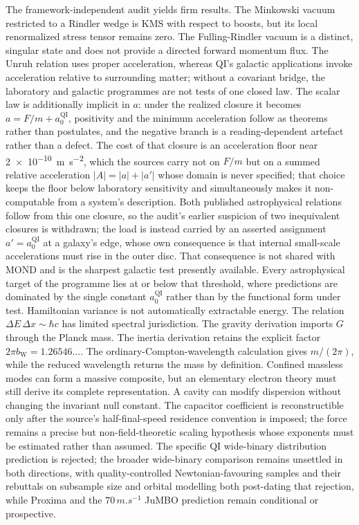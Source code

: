 \documentclass[11pt]{article}
\newcommand{\QI}{\mathrm{QI}}
\begin{document}
The framework-independent audit yields firm results. The Minkowski vacuum restricted to a Rindler wedge is KMS with respect to boosts, but its local renormalized stress tensor remains zero. The Fulling-Rindler vacuum is a distinct, singular state and does not provide a directed forward momentum flux. The Unruh relation uses proper acceleration, whereas QI's galactic applications invoke acceleration relative to surrounding matter; without a covariant bridge, the laboratory and galactic programmes are not tests of one closed law. The scalar law is additionally implicit in \(a\): under the realized closure it becomes \(a=F/m+a_{0}^{\QI}\), positivity and the minimum acceleration follow as theorems rather than postulates, and the negative branch is a reading-dependent artefact rather than a defect. The cost of that closure is an acceleration floor near \SI{2e-10}{m.s^{-2}}, which the sources carry not on \(F/m\) but on a summed relative acceleration \(|A|=|a|+|a'|\) whose domain is never specified; that choice keeps the floor below laboratory sensitivity and simultaneously makes it non-computable from a system's description. Both published astrophysical relations follow from this one closure, so the audit's earlier suspicion of two inequivalent closures is withdrawn; the load is instead carried by an asserted assignment \(a'=a_{0}^{\QI}\) at a galaxy's edge, whose own consequence is that internal small-scale accelerations must rise in the outer disc. That consequence is not shared with MOND and is the sharpest galactic test presently available. Every astrophysical target of the programme lies at or below that threshold, where predictions are dominated by the single constant \(a_{0}^{\QI}\) rather than by the functional form under test. Hamiltonian variance is not automatically extractable energy. The relation \(\Delta E\,\Delta x\sim\hbar c\) has limited spectral jurisdiction. The gravity derivation imports \(G\) through the Planck mass. The inertia derivation retains the explicit factor \(2\pi b_{\mathrm W}=1.26546\ldots\). The ordinary-Compton-wavelength calculation gives \(m/(2\pi)\), while the reduced wavelength returns the mass by definition. Confined massless modes can form a massive composite, but an elementary electron theory must still derive its complete representation. A cavity can modify dispersion without changing the invariant null constant. The capacitor coefficient is reconstructible only after the source's half-final-speed residence convention is imposed; the force remains a precise but non-field-theoretic scaling hypothesis whose exponents must be estimated rather than assumed. The specific QI wide-binary distribution prediction is rejected; the broader wide-binary comparison remains unsettled in both directions, with quality-controlled Newtonian-favouring samples and their rebuttals on subsample size and orbital modelling both post-dating that rejection, while Proxima and the \(70\,\si{m.s^{-1}}\) JuMBO prediction remain conditional or prospective.
\end{document}
